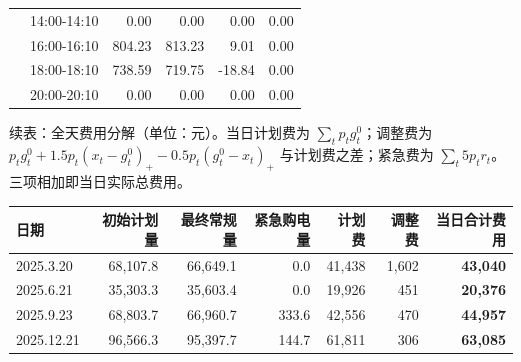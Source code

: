 \begin{table}[htbp]
\begin{tabular}{llrrrr}
     & 14{:}00-14{:}10 & 0.00 & 0.00 & 0.00 & 0.00 \\
     & 16{:}00-16{:}10 & 804.23 & 813.23 & 9.01 & 0.00 \\
     & 18{:}00-18{:}10 & 738.59 & 719.75 & -18.84 & 0.00 \\
     & 20{:}00-20{:}10 & 0.00 & 0.00 & 0.00 & 0.00 \\
    \bottomrule
  \end{tabular}
  \par\vspace{2pt}
  \begin{minipage}{.92\textwidth}\footnotesize
    续表：全天费用分解（单位：元）。当日计划费为 $\sum_t p_tg^0_t$；调整费为 $p_tg^0_t+1.5p_t(x_t-g^0_t)_+-0.5p_t(g^0_t-x_t)_+$ 与计划费之差；紧急费为 $\sum_t5p_tr_t$。三项相加即当日实际总费用。
  \end{minipage}
  \par\vspace{4pt}
  \begin{tabular}{lrrrrrr}
    \toprule
    日期 & 初始计划量 & 最终常规量 & 紧急购电量 & 计划费 & 调整费 & 当日合计费用 \\
    \midrule
    2025.3.20 & 68,107.8 & 66,649.1 & 0.0 & 41,438 & 1,602 & \textbf{43,040} \\
    2025.6.21 & 35,303.3 & 35,603.4 & 0.0 & 19,926 & 451 & \textbf{20,376} \\
    2025.9.23 & 68,803.7 & 66,960.7 & 333.6 & 42,556 & 470 & \textbf{44,957} \\
    2025.12.21 & 96,566.3 & 95,397.7 & 144.7 & 61,811 & 306 & \textbf{63,085} \\
    \bottomrule
  \end{tabular}
\end{table}

